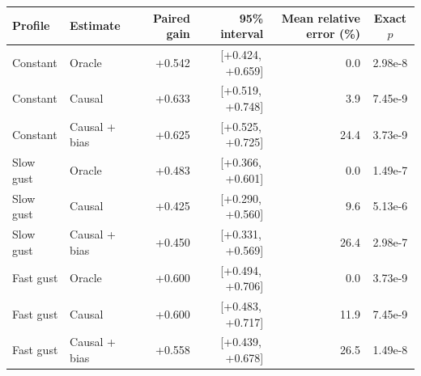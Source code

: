\begin{tabular}{llrrrc}
\toprule
Profile & Estimate & Paired gain & 95\% interval & Mean relative error (\%) & Exact $p$ \\
\midrule
Constant & Oracle & +0.542 & [+0.424,\, +0.659] & 0.0 & 2.98e-8 \\
Constant & Causal & +0.633 & [+0.519,\, +0.748] & 3.9 & 7.45e-9 \\
Constant & Causal + bias & +0.625 & [+0.525,\, +0.725] & 24.4 & 3.73e-9 \\
Slow gust & Oracle & +0.483 & [+0.366,\, +0.601] & 0.0 & 1.49e-7 \\
Slow gust & Causal & +0.425 & [+0.290,\, +0.560] & 9.6 & 5.13e-6 \\
Slow gust & Causal + bias & +0.450 & [+0.331,\, +0.569] & 26.4 & 2.98e-7 \\
Fast gust & Oracle & +0.600 & [+0.494,\, +0.706] & 0.0 & 3.73e-9 \\
Fast gust & Causal & +0.600 & [+0.483,\, +0.717] & 11.9 & 7.45e-9 \\
Fast gust & Causal + bias & +0.558 & [+0.439,\, +0.678] & 26.5 & 1.49e-8 \\
\bottomrule
\end{tabular}

